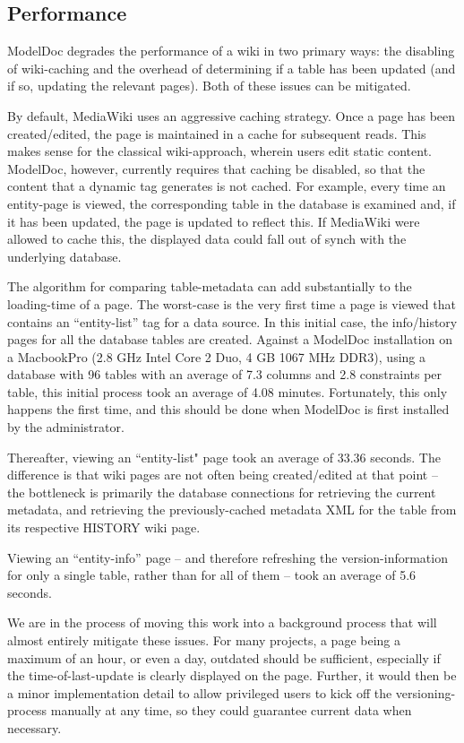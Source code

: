 \documentclass{acm_proc_article-sp}
\begin{document}
\subsection{Performance}

ModelDoc degrades the performance of a wiki in two primary ways: the disabling
of wiki-caching and the overhead of determining if a table has been updated
(and if so, updating the relevant pages). Both of these issues can be mitigated.

By default, MediaWiki uses an aggressive caching strategy.  Once a page has
been created/edited, the page is maintained in a cache for subsequent reads. 
This makes sense for the classical wiki-approach, wherein users edit static
content.  ModelDoc, however, currently requires that caching be disabled, so
that the content that a dynamic tag generates is not cached.  For example,
every time an entity-page is viewed, the corresponding table in the database is
examined and, if it has been updated, the page is updated to reflect this.  If
MediaWiki were allowed to cache this, the displayed data could fall out of
synch with the underlying database.

The algorithm for comparing table-metadata can add substantially to the
loading-time of a page.  The worst-case is the very first time a page is viewed
that contains an ``entity-list'' tag for a data source.  In this initial case,
the info/history pages for all the database tables are created.  Against a
ModelDoc installation on a MacbookPro (2.8 GHz Intel Core 2 Duo, 4 GB 1067 MHz
DDR3), using a database with 96 tables with an average of 7.3
columns and 2.8 constraints per table, this initial process took
an average of 4.08 minutes.  Fortunately, this only happens the first time, and
this should be done when ModelDoc is first installed by the administrator.

Thereafter, viewing an ``entity-list" page took an average of 33.36 seconds. The
difference is that wiki pages are not often being created/edited at that point
-- the bottleneck is primarily the database connections for retrieving the
current metadata, and retrieving the previously-cached metadata XML for the
table from its respective HISTORY wiki page.

Viewing an ``entity-info'' page -- and therefore refreshing the
version-information for only a single table, rather than for all of them --
took an average of 5.6 seconds.

We are in the process of moving this work into a background process that will
almost entirely mitigate these issues.  For many projects, a page being a
maximum of an hour, or even a day, outdated should be sufficient, especially if
the time-of-last-update is clearly displayed on the page.  Further, it would
then be a minor implementation detail to allow privileged users to kick off
the versioning-process manually at any time, so they could guarantee current
data when necessary.
\end{document}

